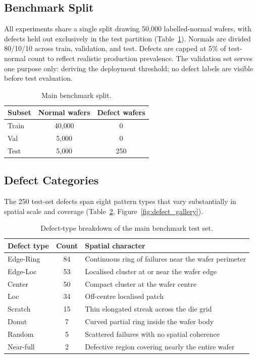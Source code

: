 \documentclass[11pt]{article}
\begin{document}
\subsection{Benchmark Split}

All experiments share a single split drawing 50,000 labelled-normal wafers,
with defects held out exclusively in the test partition (Table~\ref{tab:main_split}).
Normals are divided 80/10/10 across train, validation, and test.
Defects are capped at 5\% of test-normal count to reflect realistic production
prevalence. The validation set serves one purpose only: deriving the deployment
threshold; no defect labels are visible before test evaluation.

\begin{table}[H]
\centering
\caption{Main benchmark split.}
\label{tab:main_split}
\begin{tabular}{lcc}
\toprule
Subset & Normal wafers & Defect wafers \\
\midrule
Train   & 40{,}000 & 0   \\
Val     & 5{,}000  & 0   \\
Test    & 5{,}000  & 250 \\
\bottomrule
\end{tabular}
\end{table}

\subsection{Defect Categories}

The 250 test-set defects span eight pattern types that vary substantially in
spatial scale and coverage (Table~\ref{tab:defect_types}, Figure~\ref{fig:defect_gallery}).

\begin{table}[H]
\centering
\caption{Defect-type breakdown of the main benchmark test set.}
\label{tab:defect_types}
\begin{tabularx}{\linewidth}{lc>{\raggedright\arraybackslash}X}
\toprule
Defect type & Count & Spatial character \\
\midrule
Edge-Ring & 84  & Continuous ring of failures near the wafer perimeter \\
Edge-Loc  & 53  & Localised cluster at or near the wafer edge \\
Center    & 50  & Compact cluster at the wafer centre \\
Loc       & 34  & Off-centre localised patch \\
Scratch   & 15  & Thin elongated streak across the die grid \\
Donut     & 7   & Curved partial ring inside the wafer body \\
Random    & 5   & Scattered failures with no spatial coherence \\
Near-full & 2   & Defective region covering nearly the entire wafer \\
\bottomrule
\end{tabularx}
\end{table}
\end{document}
